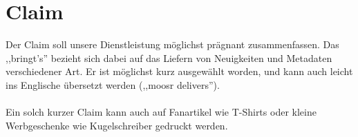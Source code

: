 \section{Claim}

Der Claim soll unsere Dienstleistung möglichst prägnant zusammenfassen.
Das ,,bringt's'' bezieht sich dabei auf das Liefern von Neuigkeiten und
Metadaten verschiedener Art. Er ist möglichst kurz ausgewählt worden, 
und kann auch leicht ins Englische übersetzt werden (,,moosr delivers'').
\\
\\
Ein solch kurzer Claim kann auch auf Fanartikel wie T-Shirts oder kleine
Werbgeschenke wie Kugelschreiber gedruckt werden.
